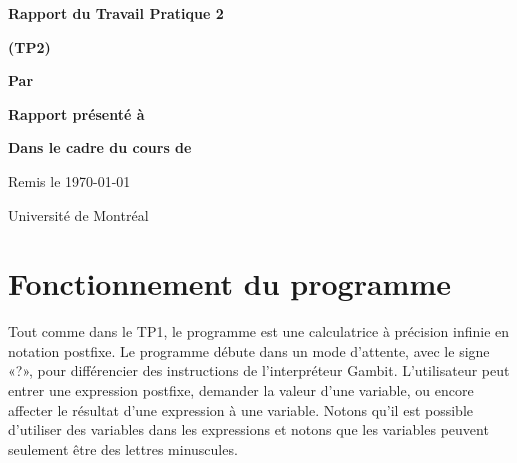 \documentclass[letterpaper,12pt]{scrartcl}
\begin{document}
	\begin{center}
		\vspace{2cm}

		{\Huge\bf\sf Rapport du Travail Pratique 2}

		\vspace{0.5cm}

		{\bf\sf (TP2)}

		\vspace{4cm}

		{\bf\sf Par}

		\vspace{0.5cm}{\large\bf\sf Sulliman Aïad et François Poitras}

		\vspace{2cm}

		{\bf\sf Rapport présenté à}

		\vspace{0.5cm}{\large\bf\sf M. Marc  Feeley}

		\vspace{2cm}

		{\bf\sf Dans le cadre du cours de}

		\vspace{0.5cm}{\large\bf\sf Concepts des langages de programmation (IFT2035)}

		\vspace{\fill}
		Remis le \today

		\vspace{0.5cm}Université de Montréal
	\end{center}
	
	\newpage

	\pagestyle{cb}
	
	\tableofcontents

	\newpage
	
	\section{Fonctionnement du programme}
	Tout comme dans le TP1, le programme est une calculatrice à précision infinie en notation postfixe. Le programme débute dans un mode d'attente, avec le signe «?», pour différencier des instructions de l'interpréteur Gambit. L'utilisateur peut entrer une expression postfixe, demander la valeur d'une variable, ou encore affecter le résultat d'une expression à une variable. Notons qu'il est possible d'utiliser des variables dans les expressions et notons que les variables peuvent seulement être des lettres minuscules.
	
	\vspace{0.5cm}
\end{document}
